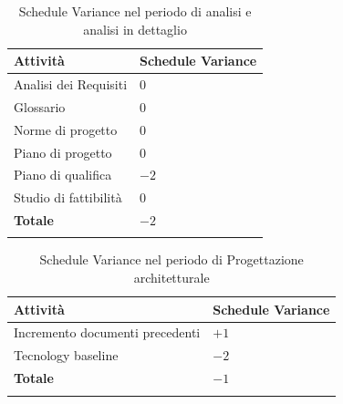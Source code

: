 		\begin{center}
   			\begin{longtable}{ | >{\raggedright\arraybackslash}m{5cm} | >{\centering\arraybackslash}m{5cm} | }
        
        	\hline
        		\textbf{Attività} & \textbf{Schedule Variance} \\ \hline
        	\endhead
        		Analisi dei Requisiti	 & $0$\\ \hline
        		Glossario	& $0$ \\ \hline
        		Norme di progetto	& $0$\\ \hline
        		Piano di progetto	& $0$\\ \hline
        		Piano di qualifica	& $-2$\\ \hline
        		Studio di fattibilità& $0$\\ \hline 
        		\hline
        		\textbf{Totale} & $-2$\\\hline
			\caption[Schedule Variance - Analisi, analisi in dettaglio]{Schedule Variance nel periodo di analisi e analisi in dettaglio}
			\end{longtable}
	
		\end{center}
	  		
	  	\begin{center}
   			\begin{longtable}{ | >{\raggedright\arraybackslash}m{5cm} | >{\centering\arraybackslash}m{5cm} | }
        
        	\hline
        		\textbf{Attività} & \textbf{Schedule Variance} \\ \hline
        	\endhead
        		Incremento documenti precedenti	 & $+1$\\ \hline
        		Tecnology baseline	& $-2$ \\ \hline
        		\hline
        		\textbf{Totale} & $-1$\\\hline
			\caption[Schedule Variance - Progettazione architetturale]{Schedule Variance nel periodo di Progettazione architetturale}
			\end{longtable}
	
		\end{center}
		
